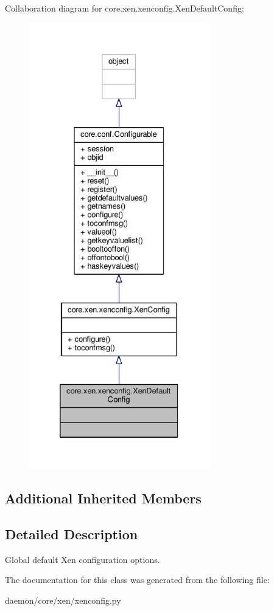 Collaboration diagram for core.\+xen.\+xenconfig.\+Xen\+Default\+Config\+:
\nopagebreak
\begin{figure}[H]
\begin{center}
\leavevmode
\includegraphics[height=550pt]{classcore_1_1xen_1_1xenconfig_1_1_xen_default_config__coll__graph}
\end{center}
\end{figure}
\subsection*{Additional Inherited Members}


\subsection{Detailed Description}
\begin{DoxyVerb}Global default Xen configuration options.
\end{DoxyVerb}
 

The documentation for this class was generated from the following file\+:\begin{DoxyCompactItemize}
\item 
daemon/core/xen/xenconfig.\+py\end{DoxyCompactItemize}
